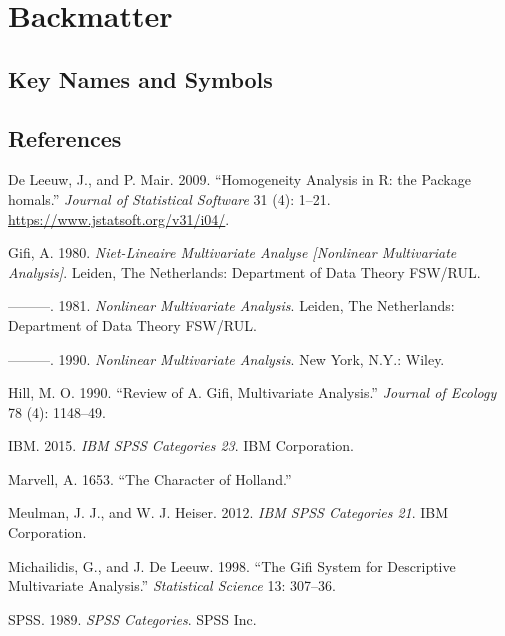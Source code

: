 \documentclass[
  12pt,
]{book}
\newlength{\cslhangindent}
\newenvironment{CSLReferences}[2] %
 {\begin{list}{}{%
  \setlength{\itemindent}{0pt}
  \setlength{\leftmargin}{0pt}
  \setlength{\parsep}{0pt}
  \ifodd #1
   \setlength{\leftmargin}{\cslhangindent}
   \setlength{\itemindent}{-1\cslhangindent}
  \fi
  \setlength{\itemsep}{#2\baselineskip}}}
 {\end{list}}
\begin{document}
\chapter{Backmatter}\label{backmatter}

\section{Key Names and Symbols}\label{key-names-and-symbols}

\section{References}\label{references}

\label{refs}
\begin{CSLReferences}{1}{0}
De Leeuw, J., and P. Mair. 2009. {``{Homogeneity Analysis in {R}: the Package homals}.''} \emph{Journal of Statistical Software} 31 (4): 1--21. \url{https://www.jstatsoft.org/v31/i04/}.

Gifi, A. 1980. \emph{Niet-Lineaire Multivariate Analyse {[}Nonlinear Multivariate Analysis{]}}. Leiden, The Netherlands: Department of Data Theory FSW/RUL.

---------. 1981. \emph{Nonlinear Multivariate Analysis}. Leiden, The Netherlands: Department of Data Theory FSW/RUL.

---------. 1990. \emph{Nonlinear Multivariate Analysis}. New York, N.Y.: Wiley.

Hill, M. O. 1990. {``{Review of A. Gifi, Multivariate Analysis}.''} \emph{Journal of Ecology} 78 (4): 1148--49.

IBM. 2015. \emph{IBM SPSS Categories 23}. IBM Corporation.

Marvell, A. 1653. {``The Character of Holland.''}

Meulman, J. J., and W. J. Heiser. 2012. \emph{IBM SPSS Categories 21}. IBM Corporation.

Michailidis, G., and J. De Leeuw. 1998. {``The Gifi System for Descriptive Multivariate Analysis.''} \emph{Statistical Science} 13: 307--36.

SPSS. 1989. \emph{SPSS Categories}. SPSS Inc.


\end{CSLReferences}
\end{document}
